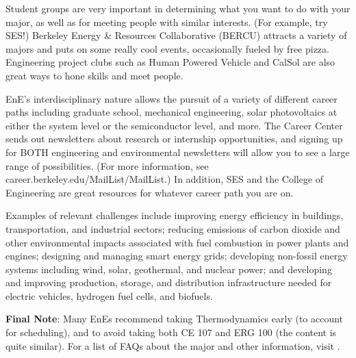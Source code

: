 Student groups are very important in determining what you want to do with your major, as well as for meeting people with similar interests. (For example, try SES!)
Berkeley Energy \& Resources Collaborative (BERCU) attracts a variety of majors and puts on some really cool events, occasionally fueled by free pizza. Engineering project clubs such as Human Powered Vehicle and CalSol are also great ways to hone skills and meet people.
 
EnE’s interdisciplinary nature allows the pursuit of a variety of different career paths including graduate school, mechanical engineering, solar photovoltaics at either the system level or the semiconductor level, and more. The Career Center sends out newsletters about research or internship opportunities, and signing up for BOTH engineering and environmental newsletters will allow you to see a large range of possibilities. (For more information, see {\selectfont career.berkeley.edu/MailList/MailList}.) In addition, SES and the College of Engineering are great resources for whatever career path you are on.
 
Examples of relevant challenges include improving energy efficiency in buildings, transportation, and industrial sectors; reducing emissions of carbon dioxide and other environmental impacts associated with fuel combustion in power plants and engines; designing and managing smart energy grids; developing non-fossil energy systems including wind, solar, geothermal, and nuclear power; and developing and improving production, storage, and distribution infrastructure needed for electric vehicles, hydrogen fuel cells, and biofuels.

\textbf{Final Note}: Many EnEs recommend taking Thermodynamics early (to account for scheduling), and to avoid taking both CE 107 and ERG 100 (the content is quite similar). For a list of FAQs about the major and other information, visit {\selectfont {}}.